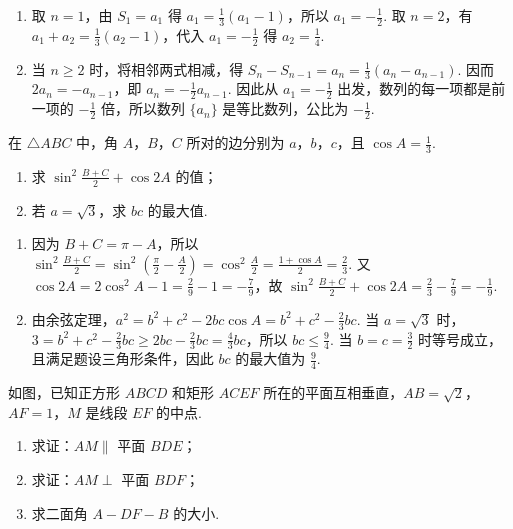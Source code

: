 \begin{solution}
\begin{enumerate}
\item 取 \(n=1\)，由 \(S_1=a_1\) 得 \(a_1=\frac{1}{3}(a_1-1)\)，所以 \(a_1=-\frac{1}{2}\). 取 \(n=2\)，有 \(a_1+a_2=\frac{1}{3}(a_2-1)\)，代入 \(a_1=-\frac{1}{2}\) 得 \(a_2=\frac{1}{4}\).
\item 当 \(n\geqslant2\) 时，将相邻两式相减，得
\(S_n-S_{n-1}=a_n=\frac{1}{3}(a_n-a_{n-1})\). 因而 \(2a_n=-a_{n-1}\)，即 \(a_n=-\frac{1}{2}a_{n-1}\). 因此从 \(a_1=-\frac{1}{2}\) 出发，数列的每一项都是前一项的 \(-\frac{1}{2}\) 倍，所以数列 \(\{a_n\}\) 是等比数列，公比为 \(-\frac{1}{2}\).
\end{enumerate}
\end{solution}

\begin{problem}
在 \(\triangle ABC\) 中，角 \(A\)，\(B\)，\(C\) 所对的边分别为 \(a\)，\(b\)，\(c\)，且 \(\cos A = \frac{1}{3}\).

\begin{enumerate}
\item 求 \(\sin^{2}\frac{B + C}{2} + \cos 2A\) 的值；
\item 若 \(a = \sqrt{3}\)，求 \(bc\) 的最大值.
\end{enumerate}
\end{problem}

\begin{solution}
\begin{enumerate}
\item 因为 \(B+C=\pi-A\)，所以
\(\sin^2\frac{B+C}{2}=\sin^2\left(\frac{\pi}{2}-\frac{A}{2}\right)=\cos^2\frac{A}{2}=\frac{1+\cos A}{2}=\frac{2}{3}\). 又 \(\cos2A=2\cos^2A-1=\frac{2}{9}-1=-\frac{7}{9}\)，故
\(\sin^2\frac{B+C}{2}+\cos2A=\frac{2}{3}-\frac{7}{9}=-\frac{1}{9}\).
\item 由余弦定理，\(a^2=b^2+c^2-2bc\cos A=b^2+c^2-\frac{2}{3}bc\). 当 \(a=\sqrt3\) 时，
\(3=b^2+c^2-\frac{2}{3}bc\geqslant2bc-\frac{2}{3}bc=\frac{4}{3}bc\)，所以 \(bc\leqslant\frac{9}{4}\). 当 \(b=c=\frac{3}{2}\) 时等号成立，且满足题设三角形条件，因此 \(bc\) 的最大值为 \(\frac{9}{4}\).
\end{enumerate}
\end{solution}

\begin{problem}
如图，已知正方形 \(ABCD\) 和矩形 \(ACEF\) 所在的平面互相垂直，\(AB = \sqrt{2}\)，\(AF = 1\)，\(M\) 是线段 \(EF\) 的中点.

\begin{enumerate}
\item 求证：\(AM \parallel\) 平面 \(BDE\)；
\item 求证：\(AM \perp\) 平面 \(BDF\)；
\item 求二面角 \(A - DF - B\) 的大小.
\end{enumerate}

\end{problem}

